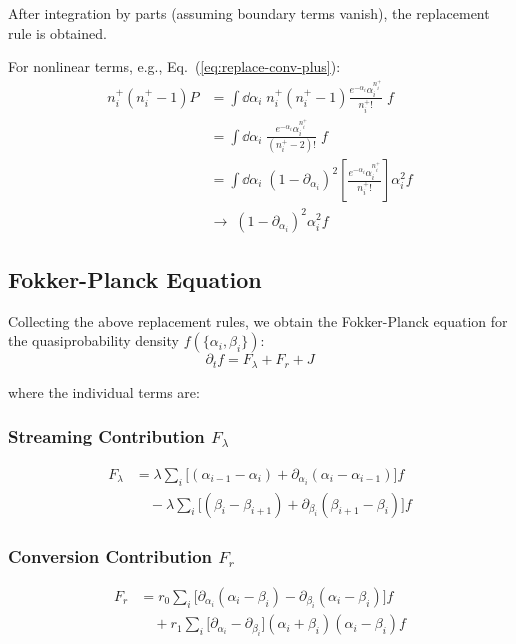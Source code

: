 After integration by parts (assuming boundary terms vanish), the replacement rule is obtained.

For nonlinear terms, e.g., Eq.~(\ref{eq:replace-conv-plus}):
\begin{align}
n_i^+(n_i^+ - 1)P &= \int \dd\alpha_i \; n_i^+(n_i^+ - 1) \frac{e^{-\alpha_i}\alpha_i^{n_i^+}}{n_i^+!} \; f \nonumber\\
&= \int \dd\alpha_i \; \frac{e^{-\alpha_i}\alpha_i^{n_i^+}}{(n_i^+ - 2)!} \; f \nonumber\\
&= \int \dd\alpha_i \; (1 - \partial_{\alpha_i})^2 \left[\frac{e^{-\alpha_i}\alpha_i^{n_i^+}}{n_i^+!}\right] \alpha_i^2 f \nonumber\\
&\to\; (1 - \partial_{\alpha_i})^2 \alpha_i^2 f \nonumber
\end{align}

\subsection{Fokker-Planck Equation}\label{subsec:fokker-planck}

Collecting the above replacement rules, we obtain the Fokker-Planck equation for the quasiprobability density $f(\{\alpha_i, \beta_i\})$:
\begin{equation}\label{eq:fpe}
\boxed{\partial_t f = F_\lambda + F_r + J}
\end{equation}

where the individual terms are:

\subsubsection{Streaming Contribution $F_\lambda$}
\begin{align}
F_\lambda &= \lambda \sum_i \Big[(\alpha_{i-1} - \alpha_i) + \partial_{\alpha_i}(\alpha_i - \alpha_{i-1})\Big]f \nonumber\\
&\quad - \lambda \sum_i \Big[(\beta_i - \beta_{i+1}) + \partial_{\beta_i}(\beta_{i+1} - \beta_i)\Big]f \label{eq:f-lambda}
\end{align}

\subsubsection{Conversion Contribution $F_r$}
\begin{align}
F_r &= r_0 \sum_i \Big[\partial_{\alpha_i}(\alpha_i - \beta_i) - \partial_{\beta_i}(\alpha_i - \beta_i)\Big]f \nonumber\\
&\quad + r_1 \sum_i \Big[\partial_{\alpha_i} - \partial_{\beta_i}\Big](\alpha_i + \beta_i)(\alpha_i - \beta_i)f \label{eq:f-r}
\end{align}

